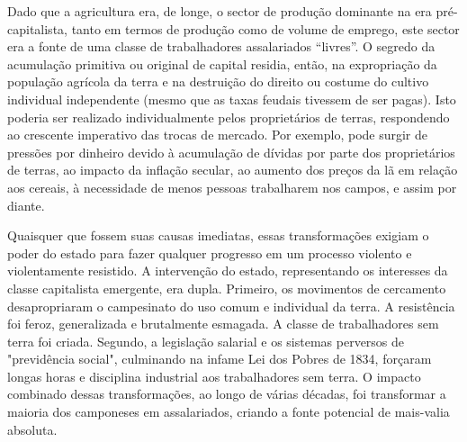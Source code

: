  \par 
Dado que a agricultura era, de longe, o sector de produção dominante na era pré-capitalista, tanto em termos de produção como de volume de emprego, este sector era a fonte de uma classe de trabalhadores assalariados “livres”. O segredo da acumulação primitiva ou original de capital residia, então, na expropriação da população agrícola da terra e na destruição do direito ou costume do cultivo individual independente (mesmo que as taxas feudais tivessem de ser pagas). Isto poderia ser realizado individualmente pelos proprietários de terras, respondendo ao crescente imperativo das trocas de mercado. Por exemplo, pode surgir de pressões por dinheiro devido à acumulação de dívidas por parte dos proprietários de terras, ao impacto da inflação secular, ao aumento dos preços da lã em relação aos cereais, à necessidade de menos pessoas trabalharem nos campos, e assim por diante.
 \par 
Quaisquer que fossem suas causas imediatas, essas transformações exigiam o poder do estado para fazer qualquer progresso em um processo violento e violentamente resistido. A intervenção do estado, representando os interesses da classe capitalista emergente, era dupla. Primeiro, os movimentos de cercamento desapropriaram o campesinato do uso comum e individual da terra. A resistência foi feroz, generalizada e brutalmente esmagada. A classe de trabalhadores sem terra foi criada. Segundo, a legislação salarial e os sistemas perversos de "previdência social", culminando na infame Lei dos Pobres de 1834, forçaram longas horas e disciplina industrial aos trabalhadores sem terra. O impacto combinado dessas transformações, ao longo de várias décadas, foi transformar a maioria dos camponeses em assalariados, criando a fonte potencial de mais-valia absoluta.
 \par 
